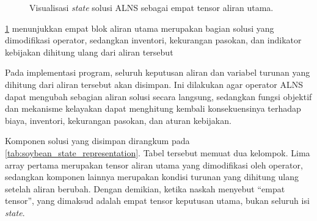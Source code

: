 \documentclass{file/TA-ITS}
\theoremstyle{definition}
\theoremstyle{definition}
\theoremstyle{plain}
\begin{document}
\begin{figure}[H]
{
}
\caption{Visualisasi \textit{state} solusi ALNS sebagai empat tensor aliran utama.}
\label{fig:representasi-solusi-alns}
\end{figure}

\ref{fig:representasi-solusi-alns} menunjukkan empat blok aliran utama merupakan bagian solusi yang dimodifikasi operator, sedangkan inventori, kekurangan pasokan, dan indikator kebijakan dihitung ulang dari aliran tersebut

Pada implementasi program, seluruh keputusan aliran dan variabel turunan yang dihitung dari aliran tersebut akan disimpan. Ini dilakukan agar operator ALNS dapat mengubah sebagian aliran solusi secara langsung, sedangkan fungsi objektif dan mekanisme kelayakan dapat menghitung kembali konsekuensinya terhadap biaya, inventori, kekurangan pasokan, dan aturan kebijakan.

Komponen solusi yang disimpan dirangkum pada \ref{tab:soybean_state_representation}. Tabel tersebut memuat dua kelompok. Lima array pertama merupakan tensor aliran utama yang dimodifikasi oleh operator, sedangkan komponen lainnya merupakan kondisi turunan yang dihitung ulang setelah aliran berubah. Dengan demikian, ketika naskah menyebut ``empat tensor'', yang dimaksud adalah empat tensor keputusan utama, bukan seluruh isi \textit{state}.
\end{document}
